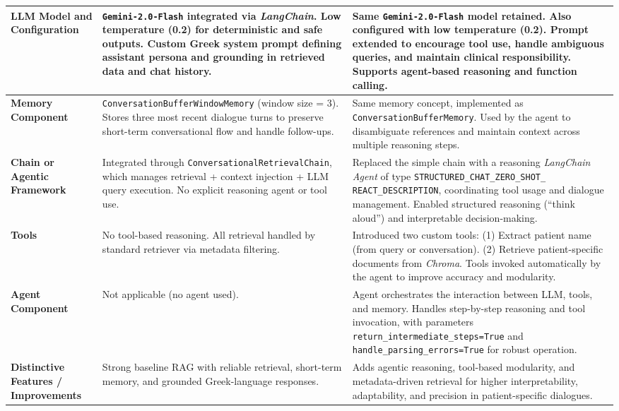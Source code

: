 \begin{longtable}{|p{3cm}|p{6.5cm}|p{6.5cm}|}
\textbf{LLM Model and Configuration} &
\texttt{Gemini-2.0-Flash} integrated via \textit{LangChain}.  
Low temperature (0.2) for deterministic and safe outputs.  
Custom Greek system prompt defining assistant persona and grounding in retrieved data and chat history. &
Same \texttt{Gemini-2.0-Flash} model retained.  
Also configured with low temperature (0.2).  
Prompt extended to encourage tool use, handle ambiguous queries, and maintain clinical responsibility.  
Supports agent-based reasoning and function calling. \\
\hline

\textbf{Memory Component} &
\texttt{ConversationBufferWindowMemory} (window size = 3).  
Stores three most recent dialogue turns to preserve short-term conversational flow and handle follow-ups. &
Same memory concept, implemented as \texttt{ConversationBufferMemory}.  
Used by the agent to disambiguate references and maintain context across multiple reasoning steps. \\
\hline

\textbf{Chain or Agentic Framework} &
Integrated through \texttt{ConversationalRetrievalChain}, which manages retrieval + context injection + LLM query execution.  
No explicit reasoning agent or tool use. &
Replaced the simple chain with a reasoning \textit{LangChain Agent} of type \texttt{STRUCTURED\_CHAT\_ZERO\_SHOT\_
REACT\_DESCRIPTION}, coordinating tool usage and dialogue management.  
Enabled structured reasoning (“think aloud”) and interpretable decision-making. \\
\hline

\textbf{Tools} &
No tool-based reasoning. All retrieval handled by standard retriever via metadata filtering. &
Introduced two custom tools:  
(1) Extract patient name (from query or conversation).  
(2) Retrieve patient-specific documents from \textit{Chroma}.  
Tools invoked automatically by the agent to improve accuracy and modularity. \\
\hline

\textbf{Agent Component} &
Not applicable (no agent used). &
Agent orchestrates the interaction between LLM, tools, and memory.  
Handles step-by-step reasoning and tool invocation, with parameters \texttt{return\_intermediate\_steps=True} and \texttt{handle\_parsing\_errors=True} for robust operation. \\
\hline

\textbf{Distinctive Features / Improvements} &
Strong baseline RAG with reliable retrieval, short-term memory, and grounded Greek-language responses. &
Adds agentic reasoning, tool-based modularity, and metadata-driven retrieval for higher interpretability, adaptability, and precision in patient-specific dialogues. \\
\hline

\end{longtable}



